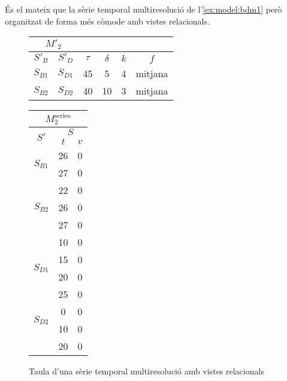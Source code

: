 \begin{example} 

\todo{}

És el mateix que la sèrie temporal multiresolució de
l'\autoref{ex:model:bdm1} però organitzat de forma més còmode amb
vistes relacionals.  


\begin{figure}[tp]
  \centering
  \begin{tabular}{|c|c|c|c|c|c|}
    \multicolumn{2}{c}{$M'_2$} \\ \hline
    $S'_B$  & $S'_D$ & $\tau$ & $\delta$ & $k$ & $f$ \\ \hline
    $S_{B1}$ & $S_{D1}$ & 45 & 5  & 4 & mitjana  \\
    $S_{B2}$ & $S_{D2}$ & 40 & 10 & 3 & mitjana  \\ \hline
  \end{tabular}\qquad
  \begin{tabular}{|c|c|c|}
    \multicolumn{3}{c}{$M^{\text{series}}_{2}$} \\ \hline
    \multirow{2}{*}{$S'$}  &  \multicolumn{2}{c|}{$S$} \\ \cline{2-3}
    & $t$      & $v$  \\ \hline
    \multirow{2}{*}{$S_{B1}$} 
    & 26 & 0 \\ 
    & 27 & 0 \\ \hline
    \multirow{3}{*}{$S_{B2}$} 
    & 22 & 0 \\ 
    & 26 & 0 \\ 
    & 27 & 0 \\ \hline
    \multirow{4}{*}{$S_{D1}$} 
    & 10 & 0 \\ 
    & 15 & 0 \\ 
    & 20 & 0 \\ 
    & 25 & 0 \\ \hline
    \multirow{2}{*}{$S_{D2}$} 
    &  0 & 0 \\ 
    & 10 & 0 \\ 
    & 20 & 0 \\ \hline
  \end{tabular}
  \caption{Taula d'una sèrie temporal multiresolució amb vistes relacionals}
  \label{fig:model:stm:vistes}
\end{figure}

\end{example}



